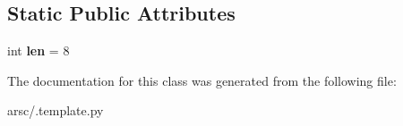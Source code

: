 \subsection*{Static Public Attributes}
\begin{DoxyCompactItemize}
\item 
\mbox{\label{class_1_1ResStringPool__header_ada0e8569d9a354b8cef985703e5f9b0e}} 
int {\bfseries len} = 8
\end{DoxyCompactItemize}


The documentation for this class was generated from the following file\+:\begin{DoxyCompactItemize}
\item 
arsc/.\+template.\+py\end{DoxyCompactItemize}
